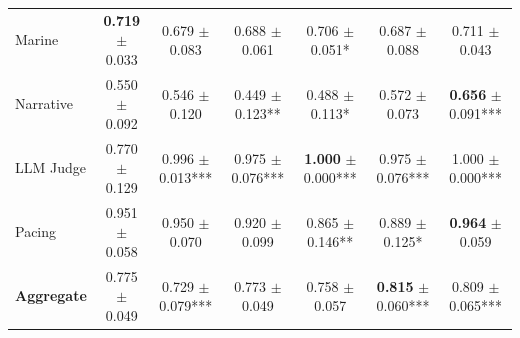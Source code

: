 \begin{table}[t]
\begin{tabular}{lcccccc}
Marine & \textbf{0.719} {\scriptsize$\pm$0.033} & 0.679 {\scriptsize$\pm$0.083} & 0.688 {\scriptsize$\pm$0.061} & 0.706 {\scriptsize$\pm$0.051}* & 0.687 {\scriptsize$\pm$0.088} & 0.711 {\scriptsize$\pm$0.043} \\
Narrative & 0.550 {\scriptsize$\pm$0.092} & 0.546 {\scriptsize$\pm$0.120} & 0.449 {\scriptsize$\pm$0.123}** & 0.488 {\scriptsize$\pm$0.113}* & 0.572 {\scriptsize$\pm$0.073} & \textbf{0.656} {\scriptsize$\pm$0.091}*** \\
LLM Judge & 0.770 {\scriptsize$\pm$0.129} & 0.996 {\scriptsize$\pm$0.013}*** & 0.975 {\scriptsize$\pm$0.076}*** & \textbf{1.000} {\scriptsize$\pm$0.000}*** & 0.975 {\scriptsize$\pm$0.076}*** & 1.000 {\scriptsize$\pm$0.000}*** \\
Pacing & 0.951 {\scriptsize$\pm$0.058} & 0.950 {\scriptsize$\pm$0.070} & 0.920 {\scriptsize$\pm$0.099} & 0.865 {\scriptsize$\pm$0.146}** & 0.889 {\scriptsize$\pm$0.125}* & \textbf{0.964} {\scriptsize$\pm$0.059} \\
\textbf{Aggregate} & 0.775 {\scriptsize$\pm$0.049} & 0.729 {\scriptsize$\pm$0.079}*** & 0.773 {\scriptsize$\pm$0.049} & 0.758 {\scriptsize$\pm$0.057} & \textbf{0.815} {\scriptsize$\pm$0.060}*** & 0.809 {\scriptsize$\pm$0.065}*** \\
\bottomrule
\end{tabular}
\end{table}